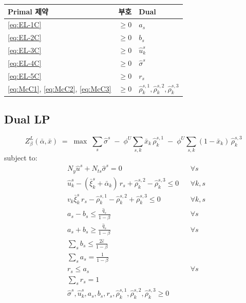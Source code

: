 \documentclass[11pt]{article}
\newcommand{\hatq}{\hat{q}}
\newcommand{\barxi}{\bar{\xi}}
\theoremstyle{plain}
\theoremstyle{remark}
\begin{document}
\begin{center}
\begin{tabular}{lll}
\toprule
Primal 제약 & 부호 & Dual \\
\midrule
\eqref{eq:EL-1C} & $\geq 0$ & $a_s$\\
\eqref{eq:EL-2C} & $\geq 0$ & $b_s$ \\
\eqref{eq:EL-3C} & $\geq 0$ & $\hat u_k^s$ \\
\eqref{eq:EL-4C} & $\geq 0$ & $\hat\sigma^s$ \\
\eqref{eq:EL-5C} & $\geq 0$ & $r_s$\\
\eqref{eq:McC1}, \eqref{eq:McC2}, \eqref{eq:McC3} & $\geq 0$ & $\hat\rho_k^{s,1}, \hat\rho_k^{s,2}, \hat\rho_k^{s,3}$ \\
\bottomrule
\end{tabular}
\end{center}

\subsection{Dual LP}

\begin{equation}\label{eq:ISP-L-CVaR-obj}
\boxed{\;
Z^L_\beta(\bar\alpha, \bar x) \;=\; \max\;\textstyle\sum_s \hat\sigma^s \;-\;\phi^U \sum_{s,k} \bar x_k\, \hat\rho_k^{s,1} \;-\;\phi^U \sum_{s,k}(1-\bar x_k)\,\hat\rho_k^{s,3}
\;}
\end{equation}
subject to:
\begin{align}
&N_y \hat u^s + N_{ts} \hat\sigma^s = 0 && \forall s \tag{DL-1C}\label{eq:DL-1C}\\
&\hat u_k^s - (\barxi_k^s + \bar\alpha_k)\,r_s + \hat\rho_k^{s,2} - \hat\rho_k^{s,3} \leq 0 && \forall k, s \tag{DL-2C}\label{eq:DL-2C}\\
&v_k\barxi_k^s\, r_s - \hat\rho_k^{s,1} - \hat\rho_k^{s,2} + \hat\rho_k^{s,3} \leq 0 && \forall k, s \tag{DL-3C}\label{eq:DL-3C}\\
&a_s - b_s \leq \tfrac{\hatq_s}{1-\beta} && \forall s \tag{DL-4C}\label{eq:DL-4C}\\
&a_s + b_s \geq \tfrac{\hatq_s}{1-\beta} && \forall s \tag{DL-5C}\label{eq:DL-5C}\\
&\textstyle\sum_s b_s \leq \tfrac{2\hat\varepsilon}{1-\beta} && \tag{DL-6C}\label{eq:DL-6C}\\
&\textstyle\sum_s a_s = \tfrac{1}{1-\beta} && \tag{DL-7C}\label{eq:DL-7C}\\
&r_s \leq a_s && \forall s \tag{DL-RU1}\label{eq:DL-RU1}\\
&\textstyle\sum_s r_s = 1 && \tag{DL-RU2}\label{eq:DL-RU2}\\
&\hat\sigma^s, \hat u_k^s, a_s, b_s, r_s, \hat\rho_k^{s,1}, \hat\rho_k^{s,2}, \hat\rho_k^{s,3} \geq 0 && \tag{DL-8C}\label{eq:DL-8C}
\end{align}
\end{document}
